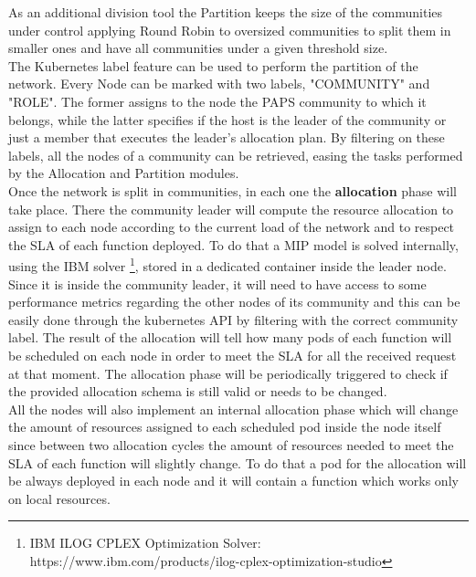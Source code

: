 \begin{figure}[h]
    \centering
    \label{fig:pseudocode}
    \label{fig:communities}
\end{figure}

As an additional division tool the Partition keeps the size of the communities under control
applying Round Robin to oversized communities to split them in smaller ones and have all 
communities under a given threshold size.\\
The Kubernetes label feature can be used to perform the partition of the network.
Every Node can be marked with two labels, "COMMUNITY" and "ROLE". The former assigns to the node 
the PAPS community to which it belongs, while the latter specifies if the host is the leader of the
community or just a member that executes the leader's allocation plan.
By filtering on these labels, all the nodes of a community can be retrieved, easing the tasks performed 
by the Allocation and Partition modules.
\\

Once the network is split in communities, in each one the \textbf{allocation} phase will take
place. There the community leader will compute the resource allocation to assign to each node
according to the current load of the network and to respect the SLA of each function deployed.
To do that a MIP model is solved internally, using the IBM solver \footnote{IBM ILOG CPLEX 
Optimization Solver: https://www.ibm.com/products/ilog-cplex-optimization-studio}, stored in 
a dedicated container inside the leader node. Since it is inside the community leader, it 
will need to have access to some performance metrics regarding the other nodes of its community
and this can be easily done through the kubernetes API by filtering with the correct community
label. The result of the allocation will tell how many pods of each function will be scheduled
on each node in order to meet the SLA for all the received request at that moment.
The allocation phase will be periodically triggered to check if the provided allocation
schema is still valid or needs to be changed. \\
All the nodes will also implement an internal allocation phase which will change the amount 
of resources assigned to each scheduled pod inside the node itself since between two 
allocation cycles the amount of resources needed to meet the SLA of each function will 
slightly change. To do that a pod for the allocation will be always deployed in each node
and it will contain a function which works only on local resources.\\

